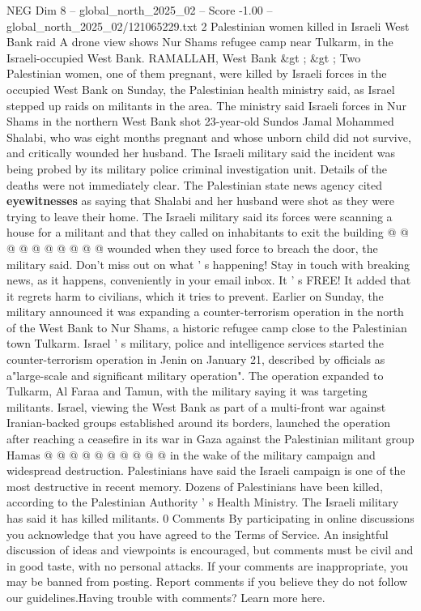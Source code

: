 \begin{textsample}{NEG Dim 8 – global\_north\_2025\_02 – Score -1.00 – global\_north\_2025\_02/121065229.txt}  \label{ex:f8_neg_142}
2 Palestinian women killed in Israeli West Bank raid A drone view shows Nur Shams refugee camp near Tulkarm, in the Israeli-occupied West Bank.
RAMALLAH, West Bank \&gt ; \&gt ; Two Palestinian women, one of them pregnant, were killed by Israeli forces in the occupied West Bank on Sunday, the Palestinian health ministry said, as Israel stepped up raids on militants in the area.
The ministry said Israeli forces in Nur Shams in the northern West Bank shot 23-year-old Sundos Jamal Mohammed Shalabi, who was eight months pregnant and whose unborn child did not survive, and critically wounded her husband.
The Israeli military said the incident was being probed by its military police criminal investigation unit.
Details of the deaths were not immediately clear.
The Palestinian state news agency cited \textbf{eyewitnesses} as saying that Shalabi and her husband were shot as they were trying to leave their home.
The Israeli military said its forces were scanning a house for a militant and that they called on inhabitants to exit the building @ @ @ @ @ @ @ @ @ @ wounded when they used force to breach the door, the military said.
Don't miss out on what ' s happening!
Stay in touch with breaking news, as it happens, conveniently in your email inbox.
It ' s FREE!
It added that it regrets harm to civilians, which it tries to prevent.
Earlier on Sunday, the military announced it was expanding a counter-terrorism operation in the north of the West Bank to Nur Shams, a historic refugee camp close to the Palestinian town Tulkarm.
Israel ' s military, police and intelligence services started the counter-terrorism operation in Jenin on January 21, described by officials as a"large-scale and significant military operation".
The operation expanded to Tulkarm, Al Faraa and Tamun, with the military saying it was targeting militants.
Israel, viewing the West Bank as part of a multi-front war against Iranian-backed groups established around its borders, launched the operation after reaching a ceasefire in its war in Gaza against the Palestinian militant group Hamas @ @ @ @ @ @ @ @ @ @ in the wake of the military campaign and widespread destruction.
Palestinians have said the Israeli campaign is one of the most destructive in recent memory.
Dozens of Palestinians have been killed, according to the Palestinian Authority ' s Health Ministry.
The Israeli military has said it has killed militants. 0 Comments By participating in online discussions you acknowledge that you have agreed to the Terms of Service.
An insightful discussion of ideas and viewpoints is encouraged, but comments must be civil and in good taste, with no personal attacks.
If your comments are inappropriate, you may be banned from posting.
Report comments if you believe they do not follow our guidelines.Having trouble with comments?
Learn more here.

\end{textsample}
